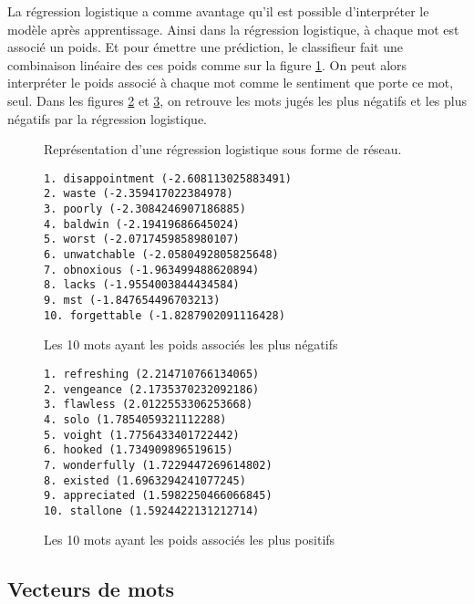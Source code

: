 \documentclass{article}
\begin{document}
La régression logistique a comme avantage qu'il est possible d'interpréter le modèle après apprentissage. Ainsi dans la régression logistique, à chaque mot est associé un poids. Et pour émettre une prédiction, le classifieur fait une combinaison linéaire des ces poids comme sur la figure \ref{lr_net}. On peut alors interpréter le poids associé à chaque mot comme le sentiment que porte ce mot, seul. Dans les figures \ref{negative} et \ref{positive}, on retrouve les mots jugés les plus négatifs et les plus négatifs par la régression logistique.

\begin{figure}
\begin{center}

\end{center}
\caption{Représentation d'une régression logistique sous forme de réseau.}
\label{lr_net}
\end{figure}


\begin{figure}[h]
\begin{verbatim}
1. disappointment (-2.608113025883491)
2. waste (-2.359417022384978)
3. poorly (-2.3084246907186885)
4. baldwin (-2.19419686645024)
5. worst (-2.0717459858980107)
6. unwatchable (-2.0580492805825648)
7. obnoxious (-1.963499488620894)
8. lacks (-1.9554003844434584)
9. mst (-1.847654496703213)
10. forgettable (-1.8287902091116428)
\end{verbatim}
\caption{Les 10 mots ayant les poids associés les plus négatifs}
\label{negative}
\end{figure}

\begin{figure}[h]
\begin{verbatim}
1. refreshing (2.214710766134065)
2. vengeance (2.1735370232092186)
3. flawless (2.0122553306253668)
4. solo (1.7854059321112288)
5. voight (1.7756433401722442)
6. hooked (1.734909896519615)
7. wonderfully (1.7229447269614802)
8. existed (1.6963294241077245)
9. appreciated (1.5982250466066845)
10. stallone (1.5924422131212714)
\end{verbatim}
\caption{Les 10 mots ayant les poids associés les plus positifs}
\label{positive}
\end{figure}

\subsection{Vecteurs de mots}
\end{document}

